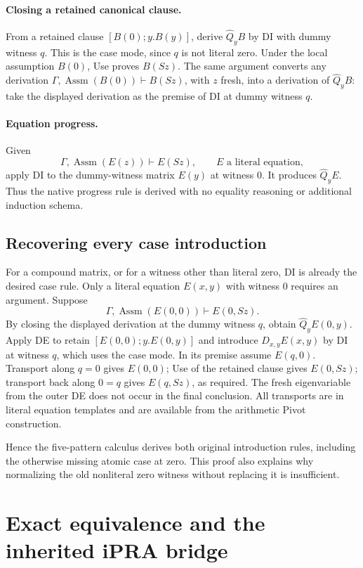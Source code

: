 \documentclass[11pt,letterpaper]{article}
\theoremstyle{definition}
\begin{document}
\paragraph{Closing a retained canonical clause.}
From a retained clause $[B(0);y.B(y)]$, derive $\widehat Q_yB$ by DI
with dummy witness $q$. This is the case mode, since $q$ is not literal
zero. Under the local assumption $B(0)$, Use proves $B(Sz)$.
The same argument converts any derivation
$\Gamma,\operatorname{Assm}(B(0))\vdash B(Sz)$, with $z$ fresh,
into a derivation of $\widehat Q_yB$: take the displayed derivation
as the premise of DI at dummy witness $q$.

\paragraph{Equation progress.}
Given
\[
 \Gamma,\operatorname{Assm}(E(z))\vdash E(Sz),
 \qquad E\text{ a literal equation},
\]
apply DI to the dummy-witness matrix $E(y)$ at witness $0$.
It produces $\widehat Q_yE$. Thus the native progress rule is derived
with no equality reasoning or additional induction schema.

\subsection{Recovering every case introduction}

For a compound matrix, or for a witness other than literal zero, DI is
already the desired case rule. Only a literal equation $E(x,y)$ with
witness $0$ requires an argument. Suppose
\[
 \Gamma,\operatorname{Assm}(E(0,0))\vdash E(0,Sz).
\]
By closing the displayed derivation at the dummy witness $q$, obtain
$\widehat Q_y E(0,y)$. Apply DE to retain
$[E(0,0);y.E(0,y)]$ and introduce $D_{x,y}E(x,y)$ by DI at witness
$q$, which uses the case mode. In its premise assume $E(q,0)$.
Transport along $q=0$ gives $E(0,0)$; Use of the retained clause gives
$E(0,Sz)$; transport back along $0=q$ gives $E(q,Sz)$, as required.
The fresh eigenvariable from the outer DE does not occur in the final
conclusion. All transports are in literal equation templates and are
available from the arithmetic Pivot construction.

Hence the five-pattern calculus derives both original introduction
rules, including the otherwise missing atomic case at zero. This proof
also explains why normalizing the old nonliteral zero witness without
replacing it is insufficient.

\section{Exact equivalence and the inherited iPRA bridge}
\label{sec:uniform-step-equivalence}
\end{document}
